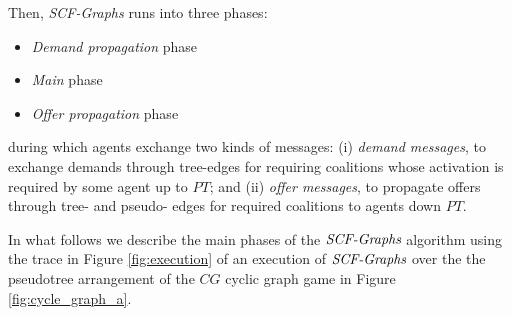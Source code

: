 \documentclass[11pt, twoside, titlepage, a4paper, openright]{report}
\begin{document}
\noindent Then, \emph{SCF-Graphs} runs into three
phases:
\begin{itemize}
\item \textit{Demand propagation} phase
\item \textit{Main} phase
\item \textit{Offer propagation} phase 
\end{itemize}

\noindent during which agents exchange two kinds of messages:
(i) \textit{demand messages}, to exchange demands through tree-edges for
requiring coalitions whose activation is required by some agent up to $PT$;
and (ii) \textit{offer messages}, to propagate offers through tree- and pseudo-
edges for required coalitions to agents down $PT$.

\noindent In what follows we describe the main phases of the $\emph{SCF-Graphs}$
algorithm using the trace in Figure \ref{fig:execution} of an execution of
$\emph{SCF-Graphs}$ over the the pseudotree arrangement of the $CG$ cyclic graph
game in Figure \ref{fig:cycle_graph_a}.
\end{document}
